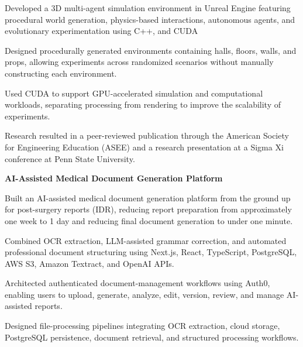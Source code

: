 \documentclass{../../../Styles/MS-Style}
\begin{document}
\begin{Form}
\begin{listBlock}
		\generalItem
		Developed a 3D multi-agent simulation environment in Unreal Engine featuring
		procedural world generation, physics-based interactions, autonomous agents,
		and evolutionary experimentation using C++, and CUDA

		\generalItem
		Designed procedurally generated environments containing halls, floors, walls,
		and props, allowing experiments across randomized scenarios without manually
		constructing each environment.

		\generalItem
		Used CUDA to support GPU-accelerated simulation and computational workloads,
		separating processing from rendering to improve the scalability of experiments.

		\generalItem
		Research resulted in a peer-reviewed publication through the American Society
		for Engineering Education (ASEE) and a research presentation at a Sigma Xi
		conference at Penn State University.\cite{AITagResearchPublication}
		\cite{AITagSigmaXIPresentation}

	\end{listBlock}




	\textbf{AI-Assisted Medical Document Generation Platform}

	\begin{listBlock}

		\generalItem
		Built an AI-assisted medical document generation platform from the ground up
		for post-surgery reports (IDR), reducing report preparation from approximately
		one week to 1 day and reducing final document generation to under one minute.

		\generalItem
		Combined OCR extraction, LLM-assisted grammar correction, and automated professional
		document structuring using Next.js, React, TypeScript, PostgreSQL, AWS S3,
		Amazon Textract, and OpenAI APIs.

		\generalItem
		Architected authenticated document-management workflows using Auth0, enabling users
		to upload, generate, analyze, edit, version, review, and manage AI-assisted reports.

		\generalItem
		Designed file-processing pipelines integrating OCR extraction, cloud storage,
		PostgreSQL persistence, document retrieval, and structured processing workflows.


\end{listBlock}
\end{Form}
\end{document}

